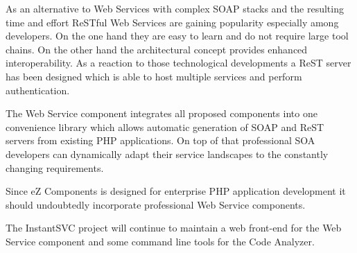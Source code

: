 \documentclass[10pt,final,a4paper,oneside]{article}
\begin{document}
As an alternative to Web Services with complex SOAP stacks and the 
resulting time and effort ReSTful Web Services are gaining popularity 
especially among developers. On the one hand they are easy to learn and 
do not require large tool chains. On the other hand the architectural 
concept provides enhanced interoperability. As a reaction to those 
technological developments a ReST server has been designed which is able 
to host multiple services and perform authentication.

The Web Service component integrates all proposed components into one convenience 
library which allows automatic generation of SOAP and ReST servers from 
existing PHP applications. On top of that professional SOA developers 
can dynamically adapt their service landscapes to the constantly 
changing requirements. 

Since eZ Components is designed for enterprise PHP application development
it should undoubtedly incorporate professional Web Service components.

The InstantSVC project will continue to maintain a web front-end for the 
Web Service component and some command line tools for the Code Analyzer. 
\end{document}
